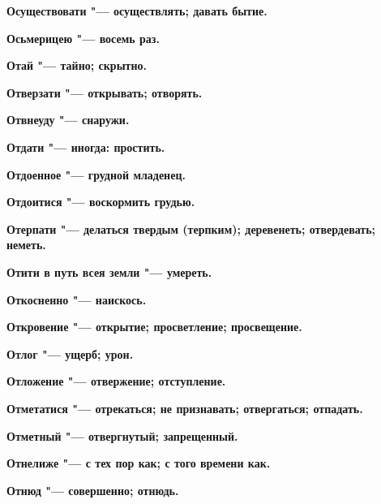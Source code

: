 \begin{multicols}{2}
\bfseries Осуществовати\normalfont{} "--- осуществлять; давать бытие. 




\bfseries Осьмерицею\normalfont{} "--- восемь раз. 




\bfseries Отай\normalfont{} "--- тайно; скрытно. 




\bfseries Отверзати\normalfont{} "--- открывать; отворять. 




\bfseries Отвнеуду\normalfont{} "--- снаружи. 




\bfseries Отдати\normalfont{} "--- иногда: простить. 




\bfseries Отдоенное\normalfont{} "--- грудной младенец. 




\bfseries Отдоитися\normalfont{} "--- воскормить грудью. 




\bfseries Отерпати\normalfont{} "--- делаться твердым (терпким); деревенеть; отвердевать; неметь. 




\bfseries Отити в путь всея земли\normalfont{} "--- умереть. 




\bfseries Откосненно\normalfont{} "--- наискось. 




\bfseries Откровение\normalfont{} "--- открытие; просветление; просвещение. 




\bfseries Отлог\normalfont{} "--- ущерб; урон. 




\bfseries Отложение\normalfont{} "--- отвержение; отступление. 




\bfseries Отметатися\normalfont{} "--- отрекаться; не признавать; отвергаться; отпадать. 




\bfseries Отметный\normalfont{} "--- отвергнутый; запрещенный. 




\bfseries Отнелиже\normalfont{} "--- с тех пор как; с того времени как. 




\bfseries Отнюд\normalfont{} "--- совершенно; отнюдь. 





\end{multicols}
